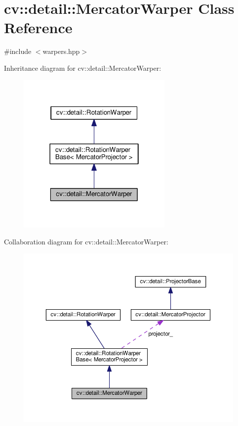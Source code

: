 \hypertarget{classcv_1_1detail_1_1MercatorWarper}{\section{cv\-:\-:detail\-:\-:Mercator\-Warper Class Reference}
\label{classcv_1_1detail_1_1MercatorWarper}
}


{\ttfamily \#include $<$warpers.\-hpp$>$}



Inheritance diagram for cv\-:\-:detail\-:\-:Mercator\-Warper\-:\nopagebreak
\begin{figure}[H]
\begin{center}
\leavevmode
\includegraphics[width=214pt]{classcv_1_1detail_1_1MercatorWarper__inherit__graph}
\end{center}
\end{figure}


Collaboration diagram for cv\-:\-:detail\-:\-:Mercator\-Warper\-:\nopagebreak
\begin{figure}[H]
\begin{center}
\leavevmode
\includegraphics[width=350pt]{classcv_1_1detail_1_1MercatorWarper__coll__graph}
\end{center}
\end{figure}
